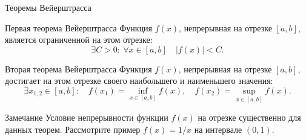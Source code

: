 \documentclass[8pt]{beamer}
\begin{document}
\begin{frame}{Теоремы Вейерштрасса}
\begin{block}{Первая теорема Вейерштрасса}
Функция $f(x)$, непрерывная на отрезке $[a,b]$, является ограниченной на этом отрезке:
$$\exists C>0:\ \forall x\in[a,b] \quad |f(x)|<C.$$
\end{block}
\begin{block}{Вторая теорема Вейерштрасса}
Функция $f(x)$, непрерывная на отрезке $[a,b]$, достигает на этом отрезке своего наибольшего и наименьшего значения:
$$\exists x_{1,2}\in[a,b]:\quad f(x_1)=\inf_{x\in[a,b]}f(x),\quad f(x_2)=\sup_{x\in[a,b]}f(x).$$
\end{block}
\begin{block}{Замечание}
Условие непрерывности функции $f(x)$ на отрезке существенно для данных теорем. Рассмотрите пример $f(x)=1/x$ на интервале $(0,1)$.
\end{block}
\end{frame}

\end{document}
